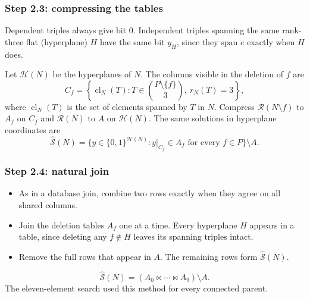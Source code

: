 \documentclass{beamer}
\newcommand{\HH}{\mathcal H}
\newcommand{\RR}{\mathcal R}
\newcommand{\cl}{\operatorname{cl}}
\begin{document}
\begin{frame}
  \frametitle{Step 2.3: compressing the tables}
  Dependent triples always give bit $0$. Independent triples
  spanning the same rank-three flat (hyperplane) $H$ have the same
  bit $y_H$, since they span $e$ exactly when $H$ does.

  \medskip
  Let $\HH(N)$ be the hyperplanes of $N$. The columns visible in
  the deletion of $f$ are
  \[
    C_f=\left\{\cl_N(T):T\in\binom{P\setminus\{f\}}{3},
                             \ r_N(T)=3\right\},
  \]
  where $\cl_N(T)$ is the set of elements spanned by $T$ in $N$.
  Compress $\RR(N\setminus f)$ to $A_f$ on $C_f$ and $\RR(N)$
  to $A$ on $\HH(N)$. The same solutions in hyperplane coordinates are
  \[
    \widehat{\mathcal S}(N)=
    \{y\in\{0,1\}^{\HH(N)}:y|_{C_f}\in A_f
                   \text{ for every }f\in P\}\setminus A.
  \]
\end{frame}

\begin{frame}
  \frametitle{Step 2.4: natural join}
  \begin{itemize}
    \item As in a database join, combine two rows exactly when they
      agree on all shared columns.
    \item Join the deletion tables $A_f$ one at a time. Every
      hyperplane $H$ appears in a table, since deleting any
      $f\notin H$ leaves its spanning triples intact.
    \item Remove the full rows that appear in $A$. The remaining
      rows form $\widehat{\mathcal S}(N)$.
  \end{itemize}
  \[
    \widehat{\mathcal S}(N)=(A_0\Join\cdots\Join A_9)\setminus A.
  \]
  The eleven-element search used this method for every connected parent.
\end{frame}
\end{document}
